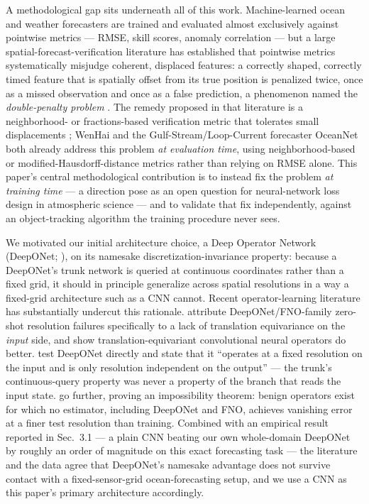 \documentclass[11pt]{article}
\begin{document}
A methodological gap sits underneath all of this work. Machine-learned ocean and weather forecasters are trained and evaluated almost exclusively against pointwise metrics --- RMSE, skill scores, anomaly correlation --- but a large spatial-forecast-verification literature has established that pointwise metrics systematically misjudge coherent, displaced features: a correctly shaped, correctly timed feature that is spatially offset from its true position is penalized twice, once as a missed observation and once as a false prediction, a phenomenon named the \textit{double-penalty problem} \citep[]{Ebert2008,Gilleland2009}. The remedy proposed in that literature is a neighborhood- or fractions-based verification metric that tolerates small displacements \citep[]{RobertsLean2008}; WenHai and the Gulf-Stream/Loop-Current forecaster OceanNet \citep[]{Chattopadhyay2024} both already address this problem \textit{at evaluation time}, using neighborhood-based or modified-Hausdorff-distance metrics rather than relying on RMSE alone. This paper's central methodological contribution is to instead fix the problem \textit{at training time} --- a direction \citet{Lagerquist2022} pose as an open question for neural-network loss design in atmospheric science --- and to validate that fix independently, against an object-tracking algorithm the training procedure never sees.

We motivated our initial architecture choice, a Deep Operator Network (DeepONet; \citealp{Lu2021}), on its namesake discretization-invariance property: because a DeepONet's trunk network is queried at continuous coordinates rather than a fixed grid, it should in principle generalize across spatial resolutions in a way a fixed-grid architecture such as a CNN cannot. Recent operator-learning literature has substantially undercut this rationale. \citet{Raonic2023} attribute DeepONet/FNO-family zero-shot resolution failures specifically to a lack of translation equivariance on the \textit{input} side, and show translation-equivariant convolutional neural operators do better. \citet{Sakarvadia2025} test DeepONet directly and state that it ``operates at a fixed resolution on the input and is only resolution independent on the output'' --- the trunk's continuous-query property was never a property of the branch that reads the input state. \citet{Subedi2026} go further, proving an impossibility theorem: benign operators exist for which no estimator, including DeepONet and FNO, achieves vanishing error at a finer test resolution than training. Combined with an empirical result reported in Sec.~3.1 --- a plain CNN beating our own whole-domain DeepONet by roughly an order of magnitude on this exact forecasting task --- the literature and the data agree that DeepONet's namesake advantage does not survive contact with a fixed-sensor-grid ocean-forecasting setup, and we use a CNN as this paper's primary architecture accordingly.
\end{document}
